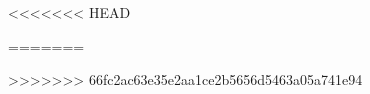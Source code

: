 

\def\title{Worksheet 2}

\newcommand{\qitem}{\qpart\item}

\renewcommand{\labelenumi}{(\alph{enumi})} %
\renewcommand{\theenumi}{(\alph{enumi})} %
\renewcommand{\labelenumii}{\roman{enumii}.} %
\renewcommand{\theenumii}{\roman{enumii}.}

\maketitle

\vspace{0.5em}

\begin{qunlist}

<<<<<<< HEAD

\newpage

\newpage

\newpage

=======

\newpage

\newpage

\newpage

>>>>>>> 66fc2ac63e35e2aa1ce2b5656d5463a05a741e94
\newpage


\end{qunlist}


